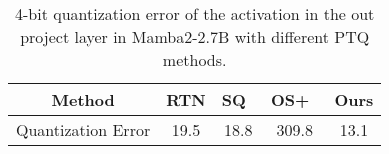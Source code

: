 
\begin{table}[!tb]
\centering
\caption{4-bit quantization error of the activation in the out project layer in Mamba2-2.7B
with different PTQ methods. }
\label{tab:quant_error}
\begin{tabular}{c|c|c|c|c}
\toprule
Method       & RTN  & SQ~\cite{xiao2023smoothquant}   & OS+~\cite{wei2023outlier}   & Ours \\ \midrule
Quantization Error & 19.5 & 18.8 & 309.8 & 13.1 \\ \bottomrule
\end{tabular}
\end{table}


